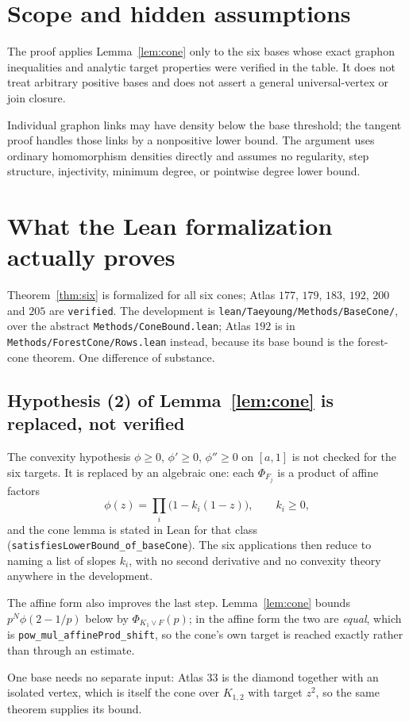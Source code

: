 \documentclass[11pt]{article}
\newcommand{\join}{\mathbin{\vee}}
\begin{document}
\section{Scope and hidden assumptions}

The proof applies Lemma~\ref{lem:cone} only to the six bases whose exact
graphon inequalities and analytic target properties were verified in
the table.  It does not treat arbitrary positive bases and does not
assert a general universal-vertex or join closure.

Individual graphon links may have density below the base threshold; the
tangent proof handles those links by a nonpositive lower bound.  The
argument uses ordinary homomorphism densities directly and assumes no
regularity, step structure, injectivity, minimum degree, or pointwise
degree lower bound.

\appendix
\section{What the Lean formalization actually proves}

Theorem~\ref{thm:six} is formalized for all six cones; Atlas $177$, $179$,
$183$, $192$, $200$ and $205$ are \texttt{verified}.  The development is
\texttt{lean/Taeyoung/Methods/BaseCone/}, over the abstract
\texttt{Methods/ConeBound.lean}; Atlas $192$ is in
\texttt{Methods/ForestCone/Rows.lean} instead, because its base bound is the
forest-cone theorem.  One difference of substance.

\subsection*{Hypothesis (2) of Lemma~\ref{lem:cone} is replaced, not verified}

The convexity hypothesis $\phi\geq0$, $\phi'\geq0$, $\phi''\geq0$ on $[a,1]$ is
not checked for the six targets.  It is replaced by an algebraic one: each
$\Phi_{F_j}$ is a product of affine factors
\[
 \phi(z)=\prod_i\bigl(1-k_i(1-z)\bigr),\qquad k_i\geq0,
\]
and the cone lemma is stated in Lean for that class
(\texttt{satisfiesLowerBound\_of\_baseCone}).  The six applications then reduce
to naming a list of slopes $k_i$, with no second derivative and no convexity
theory anywhere in the development.

The affine form also improves the last step.  Lemma~\ref{lem:cone} bounds
$p^{N}\phi(2-1/p)$ below by $\Phi_{K_1\join F}(p)$; in the affine form the two
are \emph{equal}, which is \texttt{pow\_mul\_affineProd\_shift}, so the cone's
own target is reached exactly rather than through an estimate.

One base needs no separate input: Atlas $33$ is the diamond together with an
isolated vertex, which is itself the cone over $K_{1,2}$ with target $z^2$, so
the same theorem supplies its bound.
\end{document}
